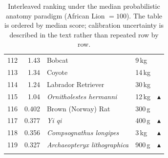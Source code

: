 \documentclass[11pt]{article}
\begin{document}
\begin{longtable}{rrllc}
112 & 1.43 & Bobcat & 9\,kg &  \\
113 & 1.34 & Coyote & 14\,kg &  \\
114 & 1.24 & Labrador Retriever & 30\,kg &  \\
115 & 1.04 & \textit{Ornitholestes hermanni} & 12\,kg & $\blacktriangle$ \\
116 & 0.402 & Brown (Norway) Rat & 300\,g &  \\
117 & 0.377 & \textit{Yi qi} & 400\,g & $\blacktriangle$ \\
118 & 0.356 & \textit{Compsognathus longipes} & 3\,kg & $\blacktriangle$ \\
119 & 0.327 & \textit{Archaeopteryx lithographica} & 900\,g & $\blacktriangle$ \\
\bottomrule
\caption{Interleaved ranking under the median probabilistic anatomy paradigm (African Lion $=100$). The table is ordered by median score; calibration uncertainty is described in the text rather than repeated row by row.}
\label{tab:interleaved}
\end{longtable}
\normalsize
\end{document}
